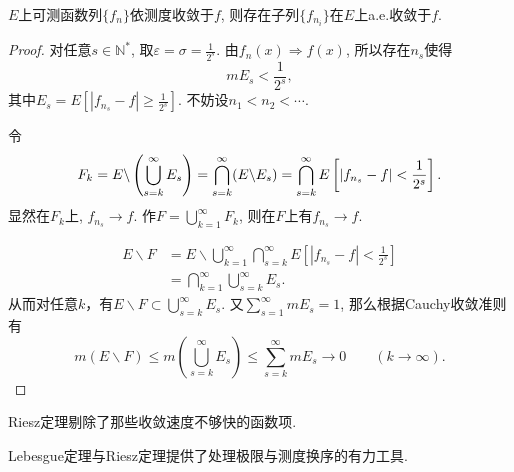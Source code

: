 \begin{theorem}[Riesz定理] \label{thm:Riesz2}
	$E$上可测函数列$\{ f_n \}$依测度收敛于$f$, 则存在子列$\{f_{n_i}\}$在$E$上a.e.收敛于$f$.
\end{theorem}

\begin{proof}
	\par 
	对任意$s \in \mathbb{N}^*$, 取$\varepsilon = \sigma = \frac 1{2^s}$. 由$f_n(x) \Rightarrow f(x)$, 所以存在$n_s$使得
		$$
			m E_s < \frac 1 {2^s},
		$$
	其中$E_s = E \left[ | f_{n_s} - f | \geq \frac 1 {2^s} \right]$. 不妨设$n_1 < n_2 < \cdots$. 

	\par
	令
		$$
			F_k = E \backslash \left( \bigcup\limits_{s = k}^{\infty} E_s \right) =  \bigcap\limits_{s = k}^{\infty} (E \backslash E_s) \\
			= \bigcap\limits_{s = k}^{\infty} E \left[ | f_{n_s} - f | < \frac 1 {2^s} \right].
		$$
	显然在$F_k$上, $f_{n_s} \to f$. 作$F = \bigcup\limits_{k = 1}^{\infty} F_k$, 则在$F$上有$f_{n_s} \to f$. 

	\par 
		$$
		\begin{aligned}
			E \backslash F
			&= E \backslash \bigcup\limits_{k = 1}^{\infty} \bigcap\limits_{s = k}^{\infty} E \left[ | f_{n_s} - f | < \frac 1 {2^s} \right] \\
			&= \bigcap\limits_{k = 1}^{\infty} \bigcup\limits_{s = k}^{\infty} E_s .
		\end{aligned}
		$$
	从而对任意$k$，有$E \backslash F \subset \bigcup\limits_{s = k}^{\infty} E_s$. 
	又$\sum\limits_{s = 1}^{\infty} m E_s = 1$, 那么根据Cauchy收敛准则有
		$$
		m(E \backslash F) \leq m \left(\bigcup\limits_{s = k}^{\infty} E_s \right) \leq \sum\limits_{s = k}^{\infty} m E_s \to 0 \qquad (k \to \infty).
		$$
\end{proof}

Riesz定理剔除了那些收敛速度不够快的函数项.

\vskip 0.2cm
Lebesgue定理与Riesz定理提供了处理极限与测度换序的有力工具. 

